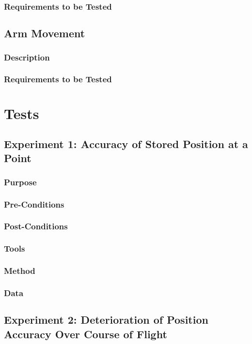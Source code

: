 \documentclass[letterpaper,10pt]{article}
\begin{document}
\subsubsection{Requirements to be Tested}

\subsection{Arm Movement}
\subsubsection{Description}
\subsubsection{Requirements to be Tested}

\section{Tests}

\subsection{Experiment 1: Accuracy of Stored Position at a Point}
\subsubsection{Purpose}
\subsubsection{Pre-Conditions}
\subsubsection{Post-Conditions}
\subsubsection{Tools}
\subsubsection{Method}
\subsubsection{Data}

\subsection{Experiment 2: Deterioration of Position Accuracy Over Course of Flight}
\end{document}
